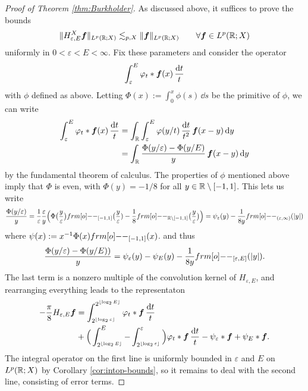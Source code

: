 \begin{proof}[Proof of Theorem \ref{thm:Burkholder}]
  As discussed above, it suffices to prove the bounds
  \begin{equation}\label{eq:HT-unifbds}
    \|H^{X}_{\varepsilon, E} \bm{f}\|_{L^p(\mathbb{R};X)} \lesssim_{p,X} \|\bm{f}\|_{L^p(\mathbb{R};X)} \qquad \forall \bm{f} \in L^p(\mathbb{R};X)
  \end{equation}
  uniformly in $0 < \varepsilon < E < \infty$.
  Fix these parameters and consider the operator
  \begin{equation*}
    \int_{\varepsilon}^{E} \varphi_{t} \ast \bm{f}(x) \, \frac{\mathrm{d} t}{t}
  \end{equation*}
  with $\phi$ defined as above.
  Letting $\Phi(x) := \int_{0}^{x} \phi(s) \, \dd s$ be the primitive of $\phi$, we can write
  \begin{equation*}
    \begin{aligned}
    \int_{\varepsilon}^{E} \varphi_{t} \ast \bm{f}(x) \, \frac{\mathrm{d} t}{t}
    &= \int_{\mathbb{R}} \int_{\varepsilon}^{E} \varphi(y/t) \, \frac{\mathrm{d} t}{t^{2}} \, \bm{f}(x - y) \, \mathrm{d} y \\
    &= \int_{\mathbb{R}} \frac{\Phi(y/\varepsilon) - \Phi(y/E) }{y} \, \bm{f}(x-y) \, \mathrm{d} y
  \end{aligned}
\end{equation*}
by the fundamental theorem of calculus.
The properties of $\phi$ mentioned above imply that $\Phi$ is even, with $\Phi(y) = -1/8$ for all $y \in \mathbb{R} \setminus [-1,1]$.
This lets us write
\begin{equation*}
  \frac{\Phi(y/\varepsilon)}{y}
  = \frac{1}{\varepsilon} \frac{\varepsilon}{y} \Big( \Phi\big(\frac{y}{\varepsilon}\big) \1_{[-1,1]}\big(\frac{y}{\varepsilon}) - \frac{1}{8}\1_{\R \sm [-1,1]}\big(\frac{y}{\varepsilon}\big) \Big) = \psi_{\varepsilon}(y) - \frac{1}{8y}\1_{(\varepsilon,\infty)}(|y|)
\end{equation*}
where $\psi(x) := x^{-1} \Phi(x) \1_{[-1,1]}(x)$.
and thus
\begin{equation*}
  \frac{\Phi(y/\varepsilon) - \Phi(y/E))}{y}
    = \psi_{\varepsilon}(y) - \psi_{E}(y) - \frac{1}{8y}\1_{[\varepsilon, E]}(|y|).
\end{equation*}
The last term is a nonzero multiple of the convolution kernel of $H_{\varepsilon, E}$, and rearranging everything leads to the representaton
\begin{equation*}
  \begin{aligned}
  -\frac{\pi}{8} H_{\varepsilon, E}\bm{f}
  &= \int_{2^{\lfloor \log_{2} \varepsilon \rfloor}}^{2^{\lfloor \log_{2} E \rfloor}} \varphi_{t} \ast \bm{f} \, \frac{\mathrm{d} t}{t} \\
  &+ \Big( \int_{2^{\lfloor \log_{2} E \rfloor}}^{E} - \int_{2^{\lfloor \log_{2} \varepsilon \rfloor}}^{\varepsilon} \Big) \varphi_{t} \ast \bm{f} \, \frac{\mathrm{d} t}{t} - \psi_{\varepsilon} \ast \bm{f} + \psi_{E} \ast \bm{f}.
\end{aligned}
\end{equation*}
The integral operator on the first line is uniformly bounded in $\varepsilon$ and $E$ on $L^p(\mathbb{R};X)$ by Corollary \ref{cor:intop-bounds}, so it remains to deal with the second line, consisting of error terms.


\end{proof}
